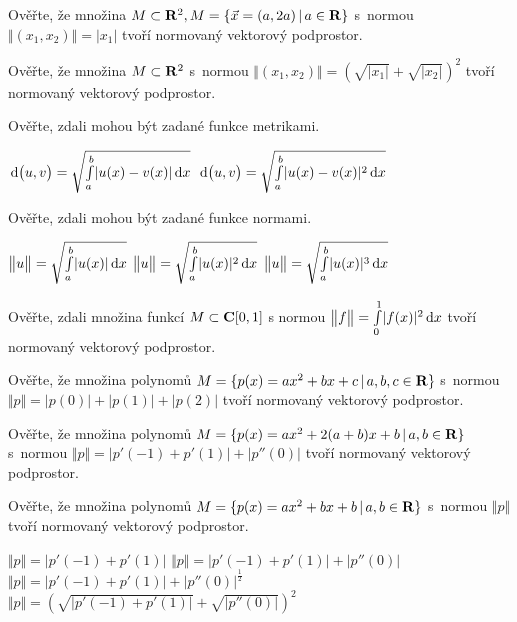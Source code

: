 \documentclass[a4paper,10pt]{book}
\def\Real{{\rm\bf R}}
\def\C{{\rm\bf C}}
\def\d{\,{\rm d}}               %
\def\abs#1{\lvert#1\rvert}
\def\norm#1{\bigl\Vert#1\bigr\Vert} %
\def\metr#1#2{\d\bigl(#1,#2\bigr)}          %
\def\where{\,|\,}                    %
\newenvironment{tabbedenum}[1]
 {\NumTabs{#1}\inparaenum\let\latexitem\item
  \def\item{\def\item{\tab\latexitem}\latexitem}}
{\endinparaenum}
\begin{document}
\vspace{0.5cm}

\exercise \label{ex:metr1} Ověřte, že množina $M \subset \Real^2, M=\{\vec{x}=(a,2a) \where a\in\Real\}$ s~normou 
  $\norm{(x_1,x_2)}=\abs{x_1}$ tvoří normovaný vektorový podprostor.
  
\exercise \label{ex:metr2} Ověřte, že množina $M \subset \Real^2$ s~normou 
  $\norm{(x_1,x_2)}=\left(\sqrt{\abs{x_1}} + \sqrt{\abs{x_2}}\right)^2$ tvoří normovaný vektorový podprostor.

\exercise \label{ex:metr3} Ověřte, zdali mohou být zadané funkce metrikami.

\begin{tabbedenum}{2}
\item $\metr{u}{v}=\sqrt{\int \limits_a^b \abs{u(x)-v(x)} \d x}$
\item $\metr{u}{v}=\sqrt{\int \limits_a^b \abs{u(x)-v(x)}^2 \d x}$
\end{tabbedenum}

\exercise \label{ex:norm1} Ověřte, zdali mohou být zadané funkce normami.

\begin{tabbedenum}{3}
\item $\norm{u}=\sqrt{\int \limits_a^b \abs{u(x)} \d x}$
\item $\norm{u}=\sqrt{\int \limits_a^b \abs{u(x)}^2 \d x}$
\item $\norm{u}=\sqrt{\int \limits_a^b \abs{u(x)}^3 \d x}$
\end{tabbedenum}

\exercise \label{ex:norm2} Ověřte, zdali množina funkcí $M \subset \C [0,1]$ s normou 
  $\norm{f}=\int \limits_0^1 \abs{f(x)}^2 \d x$ tvoří normovaný vektorový podprostor.

\exercise \label{ex:norm3} Ověřte, že množina polynomů $M = \{p(x)=ax^2+bx+c \where a,b,c \in \Real\}$ s~normou 
  $\norm{p}=\abs{p(0)}+\abs{p(1)}+\abs{p(2)}$ tvoří normovaný vektorový podprostor.

\exercise \label{ex:norm4} Ověřte, že množina polynomů $M = \{p(x)=ax^2+2(a+b)x+b \where a,b \in \Real\}$ s~normou 
  $\norm{p}=\abs{p'(-1)+p'(1)}+\abs{p''(0)}$ tvoří normovaný vektorový podprostor.
  
\exercise \label{ex:norm5} Ověřte, že množina polynomů $M = \{p(x)=ax^2+bx+b \where a,b \in \Real\}$ s~normou 
  $\norm{p}$ tvoří normovaný vektorový podprostor. 
\begin{enumerate}[label=\alph*), itemsep=-3pt, topsep=-7pt]
  \item $\norm{p}=\abs{p'(-1)+p'(1)}$
  \item $\norm{p}=\abs{p'(-1)+p'(1)}+\abs{p''(0)}$
  \item $\norm{p}=\abs{p'(-1)+p'(1)}+\abs{p''(0)}^{\frac{1}{2}}$
  \item $\norm{p}=\left(\sqrt{\abs{p'(-1)+p'(1)}}+\sqrt{\abs{p''(0)}}\right)^2$
\end{enumerate}
\end{document}
